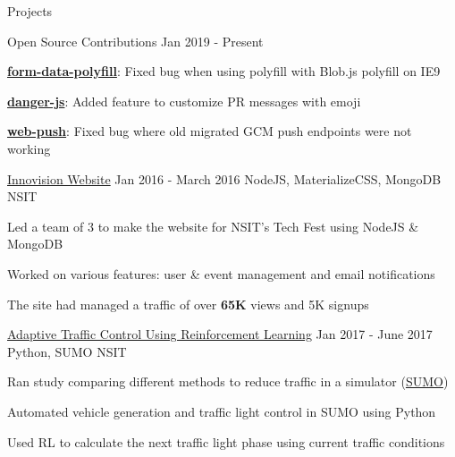 \documentclass{resume} %
\begin{document}

\begin{rSection}{Projects}

    \begin{rSubsection}
        {Open Source Contributions}
            {Jan 2019 - Present}
        {}{}

        \item \href{https://github.com/jimmywarting/FormData/pull/87}{\textbf{form-data-polyfill}}: Fixed bug when using polyfill with Blob.js polyfill on IE9
        \item \href{https://github.com/danger/danger-js/pull/892}{\textbf{danger-js}}: Added feature to customize PR messages with emoji \faHeart
        \item \href{https://github.com/web-push-libs/web-push/pull/456}{\textbf{web-push}}: Fixed bug where old migrated GCM push endpoints were not working
    \end{rSubsection}

    \begin{rSubsection}
        {\href{https://github.com/rohit-smpx/inno}{Innovision Website}}
            {Jan 2016 - March 2016}
        {NodeJS, MaterializeCSS, MongoDB}
            {NSIT} %

        \item Led a team of 3 to make the website for NSIT’s Tech Fest using NodeJS \& MongoDB
        \item Worked on various features: user \& event management and email notifications
        \item The site had managed a traffic of over \textbf{65K} views and 5K signups
    \end{rSubsection}    

    \begin{rSubsection}
        {\href{https://github.com/rohit-smpx/trafficRL}{Adaptive Traffic Control Using Reinforcement Learning}}
            {Jan 2017 - June 2017}
        {Python, SUMO}
            {NSIT}

        \item Ran study comparing different methods to reduce traffic in a simulator (\href{https://sumo.dlr.de}{SUMO})
        \item Automated vehicle generation and traffic light control in SUMO using Python
        \item Used RL to calculate the next traffic light phase using current traffic conditions
    \end{rSubsection}
    

\end{rSection}
\end{document}
